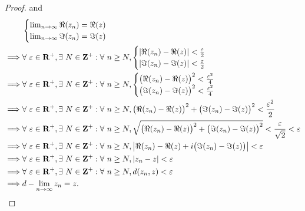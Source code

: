 \begin{proof}
    and
    \begin{align*}
                 & \begin{cases}
            \lim_{n \to \infty} \Re(z_n) = \Re(z) \\
            \lim_{n \to \infty} \Im(z_n) = \Im(z)
        \end{cases}                                                                                                                                                                                \\
        \implies & \forall\ \varepsilon \in \mathbf{R}^+, \exists\ N \in \mathbf{Z}^+ : \forall\ n \geq N, \begin{cases}
            \abs*{\Re(z_n) - \Re(z)} < \frac{\varepsilon}{2} \\
            \abs*{\Im(z_n) - \Im(z)} < \frac{\varepsilon}{2}
        \end{cases}                                                                                        \\
        \implies & \forall\ \varepsilon \in \mathbf{R}^+, \exists\ N \in \mathbf{Z}^+ : \forall\ n \geq N, \begin{cases}
            \big(\Re(z_n) - \Re(z)\big)^2 < \frac{\varepsilon^2}{4} \\
            \big(\Im(z_n) - \Im(z)\big)^2 < \frac{\varepsilon^2}{4}
        \end{cases}                                                                                        \\
        \implies & \forall\ \varepsilon \in \mathbf{R}^+, \exists\ N \in \mathbf{Z}^+ : \forall\ n \geq N, \big(\Re(z_n) - \Re(z)\big)^2 + \big(\Im(z_n) - \Im(z)\big)^2 < \frac{\varepsilon^2}{2}                           \\
        \implies & \forall\ \varepsilon \in \mathbf{R}^+, \exists\ N \in \mathbf{Z}^+ : \forall\ n \geq N, \sqrt{\big(\Re(z_n) - \Re(z)\big)^2 + \big(\Im(z_n) - \Im(z)\big)^2} < \frac{\varepsilon}{\sqrt{2}} < \varepsilon \\
        \implies & \forall\ \varepsilon \in \mathbf{R}^+, \exists\ N \in \mathbf{Z}^+ : \forall\ n \geq N, \abs*{\Re(z_n) - \Re(z) + i \big(\Im(z_n) - \Im(z)\big)} < \varepsilon                                            \\
        \implies & \forall\ \varepsilon \in \mathbf{R}^+, \exists\ N \in \mathbf{Z}^+ : \forall\ n \geq N, \abs*{z_n - z} < \varepsilon                                                                                      \\
        \implies & \forall\ \varepsilon \in \mathbf{R}^+, \exists\ N \in \mathbf{Z}^+ : \forall\ n \geq N, d(z_n, z) < \varepsilon                                                                                           \\
        \implies & d - \lim_{n \to \infty} z_n = z.
    \end{align*}
\end{proof}


